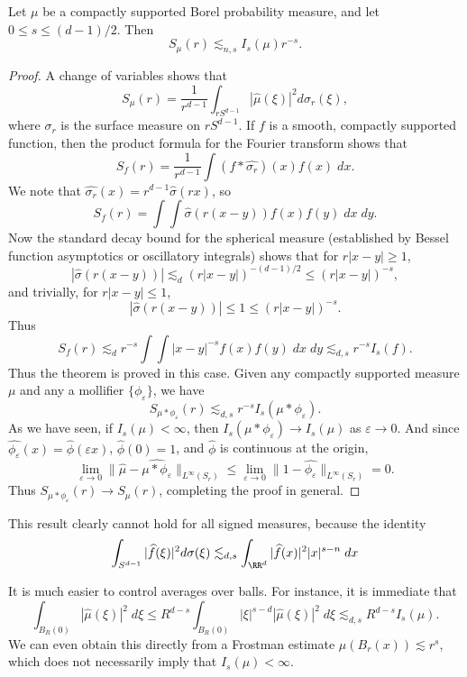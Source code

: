 \begin{theorem}
	Let $\mu$ be a compactly supported Borel probability measure, and let $0 \leq s \leq (d-1)/2$. Then
	\[ S_\mu(r) \lesssim_{n,s} I_s(\mu) r^{-s}. \]
\end{theorem}
\begin{proof}
	A change of variables shows that
	\[ S_\mu(r) = \frac{1}{r^{d-1}} \int_{rS^{d-1}} |\widehat{\mu}(\xi)|^2 d\sigma_r(\xi), \]
	where $\sigma_r$ is the surface measure on $rS^{d-1}$. If $f$ is a smooth, compactly supported function, then the product formula for the Fourier transform shows that
	\[ S_f(r) = \frac{1}{r^{d-1}} \int (f * \widehat{\sigma_r})(x) f(x)\; dx. \]
	We note that $\widehat{\sigma_r}(x) = r^{d-1} \widehat{\sigma}(rx)$, so
	\[ S_f(r) = \int \int \widehat{\sigma}(r(x-y)) f(x) f(y)\; dx\; dy. \]
	Now the standard decay bound for the spherical measure (established by Bessel function asymptotics or oscillatory integrals) shows that for $r|x-y| \geq 1$,
	\[ |\widehat{\sigma}(r(x-y))| \lesssim_d (r|x-y|)^{-(d-1)/2} \leq (r|x-y|)^{-s}, \]
	and trivially, for $r|x-y| \leq 1$,
	\[ |\widehat{\sigma}(r(x-y))| \leq 1 \leq (r|x-y|)^{-s}. \]
	Thus
	\[ S_f(r) \lesssim_d r^{-s} \int \int |x-y|^{-s} f(x) f(y)\; dx\; dy \lesssim_{d,s} r^{-s} I_s(f). \]
	Thus the theorem is proved in this case. Given any compactly supported measure $\mu$ and any a mollifier $\{ \phi_\varepsilon \}$, we have
	\[ S_{\mu * \phi_\varepsilon}(r) \lesssim_{d,s} r^{-s} I_s(\mu * \phi_\varepsilon). \]
	As we have seen, if $I_s(\mu) < \infty$, then $I_s(\mu * \phi_\varepsilon) \to I_s(\mu)$ as $\varepsilon \to 0$. And since $\widehat{\phi_\varepsilon}(x) = \widehat{\phi}(\varepsilon x)$, $\widehat{\phi}(0) = 1$, and $\widehat{\phi}$ is continuous at the origin,
	\[ \lim_{\varepsilon \to 0} \| \widehat{\mu} - \widehat{\mu * \phi_\varepsilon} \|_{L^\infty(S_r)} \leq \lim_{\varepsilon \to 0} \| 1 - \widehat{\phi_\varepsilon} \|_{L^\infty(S_r)} = 0. \]
	Thus $S_{\mu * \phi_\varepsilon}(r) \to S_\mu(r)$, completing the proof in general.
\end{proof}

\begin{remark}
	This result clearly cannot hold for all signed measures, because the identity
	\[ \int_{S^{d-1}} |\widehat{f}(\xi)|^2 d\sigma(\xi) \lesssim_{d,s} \int_{\RR^d} |\widehat{f}(x)|^2 |x|^{s-n}\; dx  \]
\end{remark}

It is much easier to control averages over balls. For instance, it is immediate that
%
\[ \int_{B_R(0)} |\widehat{\mu}(\xi)|^2\; d\xi \leq R^{d-s} \int_{B_R(0)} |\xi|^{s-d} |\widehat{\mu}(\xi)|^2\; d\xi \lesssim_{d,s} R^{d-s} I_s(\mu). \]
%
We can even obtain this directly from a Frostman estimate $\mu(B_r(x)) \lesssim r^s$, which does not necessarily imply that $I_s(\mu) < \infty$.

